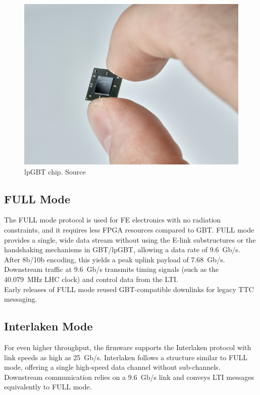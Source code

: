 \begin{figure}[H]
\centering
\includegraphics[width=\textwidth]{images/felix/lpgbt.jpg}
\caption[lpGBT chip]{\acs{lpGBT} chip. Source \protect\cite{lpgbt-image-source}}
\label{fig:lpgbt}
\end{figure}

\subsection{FULL Mode}
\label{subsec:felix-fullmode}

The FULL mode protocol \cite{fullmode} is used for \acl{FE} electronics with no radiation constraints, and it requires less \acs{FPGA} resources compared to \acs{GBT}. FULL mode provides a single, wide data stream without using the \acs{E-link} substructures or the handshaking mechanisms in \acs{GBT}/\acs{lpGBT}, allowing a data rate of 9.6~Gb/s. After 8b/10b encoding, this yields a peak uplink payload of 7.68~Gb/s.\\
Downstream traffic at 9.6~Gb/s transmits timing signals (such as the 40.079~MHz \acs{LHC} clock) and control data from the \acf{LTI}.\\
Early releases of FULL mode reused GBT-compatible downlinks for legacy \acf{TTC} messaging.

\subsection{Interlaken Mode}
\label{subsec:felix-interlaken}

For even higher throughput, the firmware supports the Interlaken protocol \cite{InterlakenSpec} with link speeds as high as 25~Gb/s. Interlaken follows a structure similar to FULL mode, offering a single high-speed data channel without sub-channels. Downstream communication relies on a 9.6~Gb/s link and conveys \acs{LTI} messages equivalently to FULL mode.

